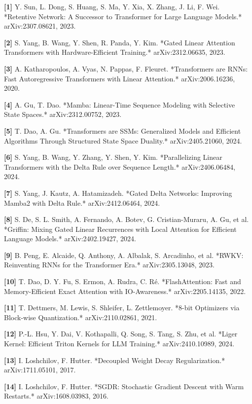 \documentclass[11pt,openany]{article}
\begin{document}
\textbf{[1]} Y. Sun, L. Dong, S. Huang, S. Ma, Y. Xia, X. Zhang, J. Li, F. Wei. *Retentive Network: A Successor to Transformer for Large Language Models.* arXiv:2307.08621, 2023.

\textbf{[2]} S. Yang, B. Wang, Y. Shen, R. Panda, Y. Kim. *Gated Linear Attention Transformers with Hardware-Efficient Training.* arXiv:2312.06635, 2023.

\textbf{[3]} A. Katharopoulos, A. Vyas, N. Pappas, F. Fleuret. *Transformers are RNNs: Fast Autoregressive Transformers with Linear Attention.* arXiv:2006.16236, 2020.

\textbf{[4]} A. Gu, T. Dao. *Mamba: Linear-Time Sequence Modeling with Selective State Spaces.* arXiv:2312.00752, 2023.

\textbf{[5]} T. Dao, A. Gu. *Transformers are SSMs: Generalized Models and Efficient Algorithms Through Structured State Space Duality.* arXiv:2405.21060, 2024.

\textbf{[6]} S. Yang, B. Wang, Y. Zhang, Y. Shen, Y. Kim. *Parallelizing Linear Transformers with the Delta Rule over Sequence Length.* arXiv:2406.06484, 2024.

\textbf{[7]} S. Yang, J. Kautz, A. Hatamizadeh. *Gated Delta Networks: Improving Mamba2 with Delta Rule.* arXiv:2412.06464, 2024.

\textbf{[8]} S. De, S. L. Smith, A. Fernando, A. Botev, G. Cristian-Muraru, A. Gu, et al. *Griffin: Mixing Gated Linear Recurrences with Local Attention for Efficient Language Models.* arXiv:2402.19427, 2024.

\textbf{[9]} B. Peng, E. Alcaide, Q. Anthony, A. Albalak, S. Arcadinho, et al. *RWKV: Reinventing RNNs for the Transformer Era.* arXiv:2305.13048, 2023.

\textbf{[10]} T. Dao, D. Y. Fu, S. Ermon, A. Rudra, C. Ré. *FlashAttention: Fast and Memory-Efficient Exact Attention with IO-Awareness.* arXiv:2205.14135, 2022.

\textbf{[11]} T. Dettmers, M. Lewis, S. Shleifer, L. Zettlemoyer. *8-bit Optimizers via Block-wise Quantization.* arXiv:2110.02861, 2021.

\textbf{[12]} P.-L. Hsu, Y. Dai, V. Kothapalli, Q. Song, S. Tang, S. Zhu, et al. *Liger Kernel: Efficient Triton Kernels for LLM Training.* arXiv:2410.10989, 2024.

\textbf{[13]} I. Loshchilov, F. Hutter. *Decoupled Weight Decay Regularization.* arXiv:1711.05101, 2017.

\textbf{[14]} I. Loshchilov, F. Hutter. *SGDR: Stochastic Gradient Descent with Warm Restarts.* arXiv:1608.03983, 2016.
\end{document}
